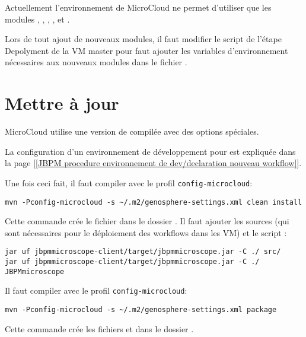 Actuellement l'environnement de MicroCloud ne permet d'utiliser que les modules , , , ,  et .

\begin{mycolorbox}
    Lors de tout ajout de nouveaux modules, il faut modifier le script de l'étape Depolyment de la VM master
    pour faut ajouter les variables d'environnement nécessaires aux nouveaux modules
    dans le fichier .
\end{mycolorbox}

\section{Mettre à jour } \label{sec:nouvelle_version_jbpmmicroscope}

MicroCloud utilise une version de  compilée avec des options spéciales.

La configuration d'un environnement de développement pour  est expliquée
dans la page \href{https://intranet.genoscope.cns.fr/agc/redmine/projects/microscopeworkflow/wiki/JBPMprocedure}{[[JBPM procedure environnement de dev/declaration nouveau workflow]]}.

Une fois ceci fait, il faut compiler  avec le profil \texttt{config-microcloud}:
\begin{lstlisting}[style=bash]
mvn -Pconfig-microcloud -s ~/.m2/genosphere-settings.xml clean install
\end{lstlisting}
Cette commande crée le fichier  dans le dossier .
Il faut ajouter les sources (qui sont nécessaires pour le déploiement des workflows dans les VM) et le script :
\begin{lstlisting}[style=bash]
jar uf jbpmmicroscope-client/target/jbpmmicroscope.jar -C ./ src/
jar uf jbpmmicroscope-client/target/jbpmmicroscope.jar -C ./ JBPMmicroscope
\end{lstlisting}

Il faut compiler  avec le profil \texttt{config-microcloud}:
\begin{lstlisting}[style=bash]
mvn -Pconfig-microcloud -s ~/.m2/genosphere-settings.xml package
\end{lstlisting}
Cette commande crée les fichiers  et 
dans le dossier .

